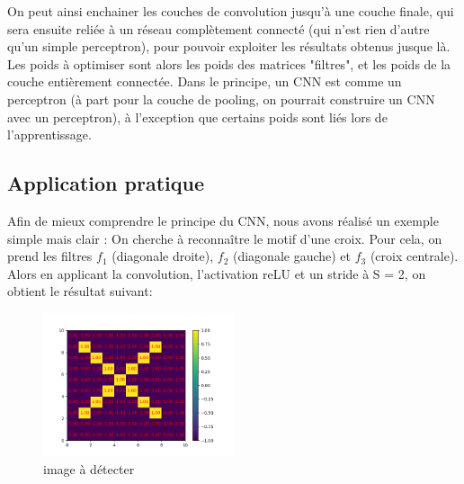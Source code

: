 On peut ainsi enchainer les couches de convolution jusqu'à une couche finale, qui sera ensuite reliée à un réseau complètement connecté (qui n'est rien d'autre qu'un simple perceptron), pour pouvoir exploiter les résultats obtenus jusque là.
Les poids à optimiser sont alors les poids des matrices "filtres", et les poids de la couche entièrement connectée.
Dans le principe, un CNN est comme un perceptron (à part pour la couche de pooling, on pourrait construire un CNN avec un perceptron), à l'exception que certains poids sont liés lors de l'apprentissage. 

\subsection{Application pratique}

Afin de mieux comprendre le principe du CNN, nous avons réalisé un exemple simple mais clair : 
On cherche à reconnaître le motif d'une croix. 
Pour cela, on prend les filtres $f_1$ (diagonale droite), $f_2$ (diagonale gauche) et $f_3$ (croix centrale).
Alors en applicant la convolution, l'activation reLU et un stride à S = 2, on obtient le résultat suivant:

\begin{figure}[h]
    \center
    \includegraphics[width=0.5\textwidth]{img/cnn_exemple/cross/image_croix.png}
    \caption{image à détecter}
\end{figure}


